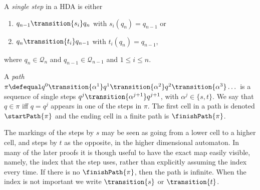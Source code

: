     \begin{definition}\label{def_paths_HDA}
        \label{def:paths-in-HDAs}
        A \emph{single step} in a HDA is either
        \begin{enumerate}
            \item $q_{n-1}\transition{s_{i}}q_{n}$ with $s_{i}(q_{n})=q_{n-1}$ or 
            \item $q_{n}\transition{t_{i}}q_{n-1}$ with $t_{i}(q_{n})=q_{n-1}$, 
        \end{enumerate}
        \noindent where $q_{n}\in \mathcal{Q}_{n}$ and $q_{n-1}\in \mathcal{Q}_{n-1}$ and $1\leq i\leq n$. 

        A \emph{path} $\pi\defequal q^{0}\transition{\alpha^{1}}q^{1}\transition{\alpha^{2}}q^{2}\transition{\alpha^{3}}\dots$ is a sequence of single steps $q^{j}\transition{\alpha^{j+1}}q^{j+1}$, with $\alpha^{j}\in\{s,t\}$. We say that $q\in\pi$ iff $q=q^{j}$ appears in one of the steps in $\pi$.  The first cell in a path is denoted $\startPath{\pi}$ and the ending cell in a finite path is $\finishPath{\pi}$. 
    \end{definition}
    
    The markings of the steps by $s$ may be seen as going from a lower cell to a higher cell, and steps by $t$ as the opposite, in the higher dimensional automaton. In many of the later proofs it is though useful to have the exact map easily visible, namely, the index that the step uses, rather than explicitly assuming the index every time. If there is no $\finishPath{\pi}$, then the path is infinite. When the index is not important we write $\transition{s}$ or $\transition{t}$.

    
